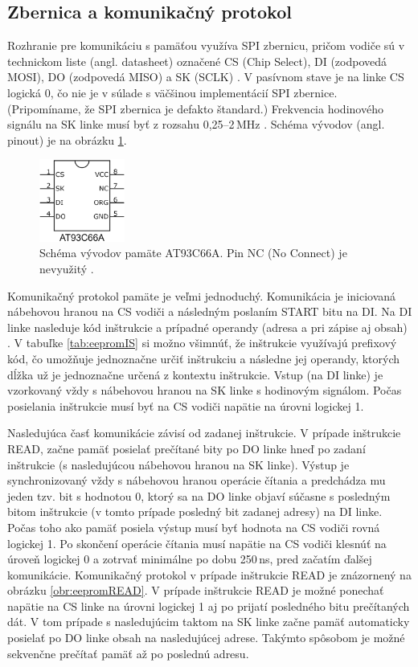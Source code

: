 \subsection{Zbernica a komunikačný protokol}
Rozhranie pre komunikáciu s pamäťou využíva SPI zbernicu, pričom vodiče sú v technickom liste (angl. datasheet) označené CS (Chip Select), DI (zodpovedá MOSI), DO (zodpovedá MISO) a SK (SCLK) \cite{eepromDatasheet}. V pasívnom stave je na linke CS logická 0, čo nie je v súlade s väčšinou implementácií SPI zbernice. (Pripomíname, že SPI zbernica je defakto štandard.) Frekvencia hodinového signálu na SK linke musí byť z rozsahu 0,25--2\,MHz \cite{eepromDatasheet}. Schéma vývodov (angl. pinout) je na obrázku \ref{obr:eepromPinout}.

\begin{figure}[h!]
    \centerline{\includegraphics[width=0.25\textwidth]{images/at93c66aPinout.png}}
    \caption[Schéma vývodov pamäte AT93C66A]{Schéma vývodov pamäte AT93C66A. Pin NC (No Connect) je nevyužitý \cite{eepromDatasheet}.}
    \label{obr:eepromPinout}
\end{figure}

Komunikačný protokol pamäte je veľmi jednoduchý. Komunikácia je iniciovaná nábehovou hranou na CS vodiči a následným poslaním START bitu na DI. Na DI linke nasleduje kód inštrukcie a prípadné operandy (adresa a pri zápise aj obsah) \cite{eepromDatasheet}. V tabuľke \ref{tab:eepromIS} si možno všimnúť, že inštrukcie využívajú prefixový kód, čo umožňuje jednoznačne určiť inštrukciu a následne jej operandy, ktorých dĺžka už je jednoznačne určená z kontextu inštrukcie. Vstup (na DI linke) je vzorkovaný vždy s nábehovou hranou na SK linke s hodinovým signálom. Počas posielania inštrukcie musí byť na CS vodiči napätie na úrovni logickej 1.

Nasledujúca časť komunikácie závisí od zadanej inštrukcie. V prípade inštrukcie READ, začne pamäť posielať prečítané bity po DO linke hneď po zadaní inštrukcie (s nasledujúcou nábehovou hranou na SK linke). Výstup je synchronizovaný vždy s nábehovou hranou operácie čítania a predchádza mu jeden tzv.  bit s hodnotou 0, ktorý sa na DO linke objaví súčasne s posledným bitom inštrukcie (v tomto prípade posledný bit zadanej adresy) na DI linke. Počas toho ako pamäť posiela výstup musí byť hodnota na CS vodiči rovná logickej 1. Po skončení operácie čítania musí napätie na CS vodiči klesnúť na úroveň logickej 0 a zotrvať minimálne po dobu 250\,ns, pred začatím ďalšej komunikácie. Komunikačný protokol v prípade inštrukcie READ je znázornený na obrázku \ref{obr:eepromREAD}. V prípade inštrukcie READ je možné ponechať napätie na CS linke na úrovni logickej 1 aj po prijatí posledného bitu prečítaných dát. V tom prípade s nasledujúcim taktom na SK linke začne pamäť automaticky posielať po DO linke obsah na nasledujúcej adrese. Takýmto spôsobom je možné sekvenčne prečítať pamäť až po poslednú adresu.

